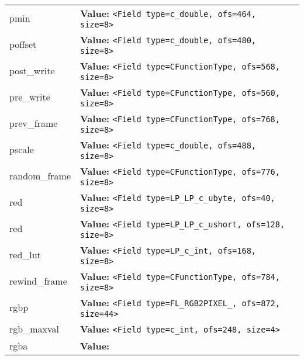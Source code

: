\begin{longtable}{|p{\varnamewidth}|p{\vardescrwidth}|l}
\cline{1-2}
\raggedright p\-m\-i\-n\- & \raggedright \textbf{Value:} 
{\tt {\textless}Field type=c\_double, ofs=464, size=8{\textgreater}}&\\
\cline{1-2}
\raggedright p\-o\-f\-f\-s\-e\-t\- & \raggedright \textbf{Value:} 
{\tt {\textless}Field type=c\_double, ofs=480, size=8{\textgreater}}&\\
\cline{1-2}
\raggedright p\-o\-s\-t\-\_\-w\-r\-i\-t\-e\- & \raggedright \textbf{Value:} 
{\tt {\textless}Field type=CFunctionType, ofs=568, size=8{\textgreater}}&\\
\cline{1-2}
\raggedright p\-r\-e\-\_\-w\-r\-i\-t\-e\- & \raggedright \textbf{Value:} 
{\tt {\textless}Field type=CFunctionType, ofs=560, size=8{\textgreater}}&\\
\cline{1-2}
\raggedright p\-r\-e\-v\-\_\-f\-r\-a\-m\-e\- & \raggedright \textbf{Value:} 
{\tt {\textless}Field type=CFunctionType, ofs=768, size=8{\textgreater}}&\\
\cline{1-2}
\raggedright p\-s\-c\-a\-l\-e\- & \raggedright \textbf{Value:} 
{\tt {\textless}Field type=c\_double, ofs=488, size=8{\textgreater}}&\\
\cline{1-2}
\raggedright r\-a\-n\-d\-o\-m\-\_\-f\-r\-a\-m\-e\- & \raggedright \textbf{Value:} 
{\tt {\textless}Field type=CFunctionType, ofs=776, size=8{\textgreater}}&\\
\cline{1-2}
\raggedright r\-e\-d\- & \raggedright \textbf{Value:} 
{\tt {\textless}Field type=LP\_LP\_c\_ubyte, ofs=40, size=8{\textgreater}}&\\
\cline{1-2}
\raggedright r\-e\-d\-1\-6\- & \raggedright \textbf{Value:} 
{\tt {\textless}Field type=LP\_LP\_c\_ushort, ofs=128, size=8{\textgreater}}&\\
\cline{1-2}
\raggedright r\-e\-d\-\_\-l\-u\-t\- & \raggedright \textbf{Value:} 
{\tt {\textless}Field type=LP\_c\_int, ofs=168, size=8{\textgreater}}&\\
\cline{1-2}
\raggedright r\-e\-w\-i\-n\-d\-\_\-f\-r\-a\-m\-e\- & \raggedright \textbf{Value:} 
{\tt {\textless}Field type=CFunctionType, ofs=784, size=8{\textgreater}}&\\
\cline{1-2}
\raggedright r\-g\-b\-2\-p\- & \raggedright \textbf{Value:} 
{\tt {\textless}Field type=FL\_RGB2PIXEL\_, ofs=872, size=44{\textgreater}}&\\
\cline{1-2}
\raggedright r\-g\-b\-\_\-m\-a\-x\-v\-a\-l\- & \raggedright \textbf{Value:} 
{\tt {\textless}Field type=c\_int, ofs=248, size=4{\textgreater}}&\\
\cline{1-2}
\raggedright r\-g\-b\-a\- & \raggedright \textbf{Value:} 

\end{longtable}
